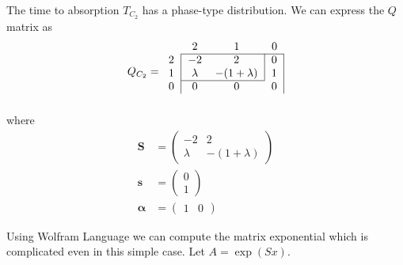 \documentclass{article}
\theoremstyle{plain}
\theoremstyle{definition}
\theoremstyle{remark}
\numberwithin{equation}{section}
\begin{document}
The time to absorption $T_{C_2}$ has a phase-type distribution.
We can express the $Q$ matrix as
$$
Q_{C_2} = \begin{blockarray}{cccc}
    & 2 & 1 & 0\\
    \cline{2-4}
    \begin{block}{c|cc|c|}
        2 & -2 & 2 & 0\\
        1 & \lambda & - (1 + \lambda) & 1\\
        \cline{2-3}
    \end{block}
    \begin{block}{c|ccc|}
        0 & 0 & 0 & 0\\
    \end{block}
\end{blockarray}
$$
where
\begin{align*}
    \mathbf{S} &= \begin{pmatrix}
        -2 & 2\\
        \lambda & - (1 + \lambda)
    \end{pmatrix}\\
    \mathbf{s} &= \begin{pmatrix}
        0\\
        1
    \end{pmatrix}\\
    \boldsymbol{\alpha} &= \begin{pmatrix}
    1 & 0
    \end{pmatrix}
\end{align*}


Using Wolfram Language we can compute the matrix exponential which is complicated even in this simple case. Let $A = \exp(Sx)$.
\end{document}
